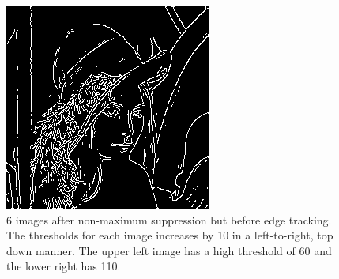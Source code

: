 \documentclass{ee208report}
\begin{document}
\begin{figure}[H]
    \includegraphics[width=0.35\linewidth]{images/high_threshold/110.png}
    \caption{6 images after non-maximum suppression but before edge tracking.
    The thresholds for each image increases by 10 in a left-to-right, top down
    manner. The upper left image has a high threshold of 60 and the lower right
    has 110.}
    \label{fig:high-t}
\end{figure}
\end{document}
